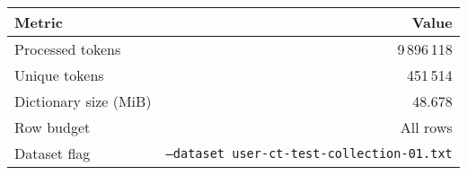 \begin{tabular}{lr}
\toprule
Metric & Value \\
\midrule
Processed tokens & 9\,896\,118 \\
Unique tokens & 451\,514 \\
Dictionary size (MiB) & 48.678 \\
Row budget & All rows \\
Dataset flag & \texttt{--dataset~user-ct-test-collection-01.txt} \\
\bottomrule
\end{tabular}